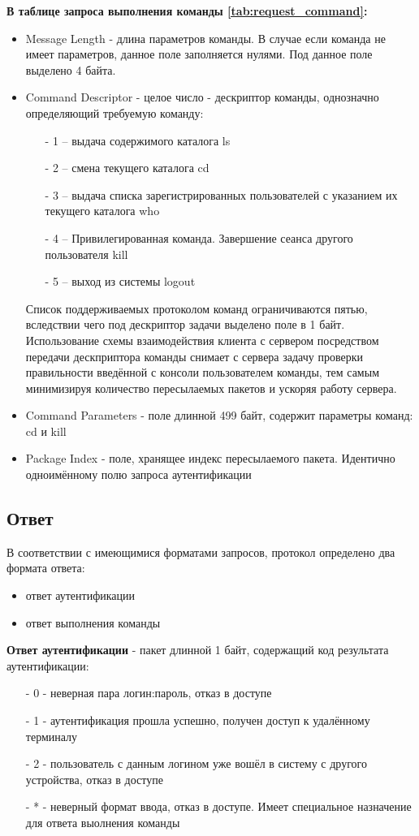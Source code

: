 \textbf{В таблице запроса выполнения команды \ref{tab:request_command}:}
\begin{itemize}
\item Message Length - длина параметров команды. В случае если команда не имеет параметров, данное поле заполняется нулями. Под данное поле выделено 4 байта.
\item Command Descriptor - целое число - дескриптор команды, однозначно определяющий требуемую команду:
\begin{itemize}
\item[-] 1 – выдача содержимого каталога ls
\item[-] 2 – смена текущего каталога cd
\item[-] 3 – выдача списка зарегистрированных пользователей с указанием их текущего каталога who
\item[-] 4 – Привилегированная команда. Завершение сеанса другого пользователя kill
\item[-] 5 – выход из системы logout
\end{itemize}
Список поддерживаемых протоколом команд ограничиваются пятью, вследствии чего под дескриптор задачи выделено поле в 1 байт. Использование схемы взаимодействия клиента с сервером посредством передачи дескприптора команды снимает с сервера задачу проверки правильности введённой с консоли пользователем команды, тем самым минимизируя количество пересылаемых пакетов и ускоряя работу сервера.

\item Command Parameters - поле длинной 499 байт, содержит параметры команд: cd и kill
\item Package Index - поле, хранящее индекс пересылаемого пакета. Идентично одноимённому полю запроса аутентификации
\end{itemize}

\subsection{Ответ}
В соответствии с имеющимися форматами запросов, протокол определено два формата ответа:
\begin{itemize}
\item ответ аутентификации
\item ответ выполнения команды
\end{itemize}

\textbf{Ответ аутентификации} - пакет длинной 1 байт, содержащий код результата аутентификации:
\begin{itemize}
\item[-] 0 - неверная пара логин:пароль, отказ в доступе
\item[-] 1 - аутентификация прошла успешно, получен доступ к удалённому терминалу
\item[-] 2 - пользователь с данным логином уже вошёл в систему с другого устройства, отказ в доступе
\item[-] * - неверный формат ввода, отказ в доступе. Имеет специальное назначение для ответа выолнения команды
\end{itemize}

